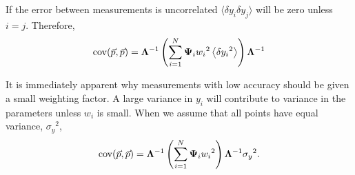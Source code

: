 \documentclass{article}
\def\p{\vec{p}}
\def\LAM{{\bf \Lambda}}
\def\PSI{{\bf \Psi}}
\begin{document}
If the error between measurements is uncorrelated $\langle \delta y_i \delta y_j \rangle$ will be zero unless $i=j$.  Therefore,
\begin{align}
\mathrm{cov}(\p,\p) = \LAM^{-1} \left( \sum_{i=1}^N \PSI_i w_i{^2} \left\langle \delta y_i{^2} \right\rangle \right) \LAM^{-1}\label{eqn:covar}
\end{align}

It is immediately apparent why measurements with low accuracy should be given a small weighting factor.  A large variance in $y_i$ will contribute to variance in the parameters unless $w_i$ is small.  When we assume that all points have equal variance, $\sigma_y{^2}$,
\begin{align}
\mathrm{cov}(\p,\p) =  \LAM^{-1} \left( \sum_{i=1}^N \PSI_i w_i{^2} \right) \LAM^{-1} \sigma_y{^2}.\label{eqn:covar2}
\end{align}
\end{document}
